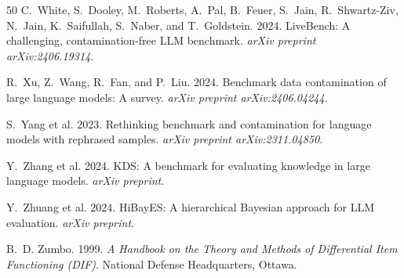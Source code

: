 \documentclass[11pt,a4paper]{article}
\begin{document}
\begin{thebibliography}{50}
C.~White, S.~Dooley, M.~Roberts, A.~Pal, B.~Feuer, S.~Jain, R.~Shwartz-Ziv, N.~Jain, K.~Saifullah, S.~Naber, and T.~Goldstein. 2024.
\newblock LiveBench: A challenging, contamination-free LLM benchmark.
\newblock \emph{arXiv preprint arXiv:2406.19314}.

R.~Xu, Z.~Wang, R.~Fan, and P.~Liu. 2024.
\newblock Benchmark data contamination of large language models: A survey.
\newblock \emph{arXiv preprint arXiv:2406.04244}.

S.~Yang et al. 2023.
\newblock Rethinking benchmark and contamination for language models with rephrased samples.
\newblock \emph{arXiv preprint arXiv:2311.04850}.

Y.~Zhang et al. 2024.
\newblock KDS: A benchmark for evaluating knowledge in large language models.
\newblock \emph{arXiv preprint}.

Y.~Zhuang et al. 2024.
\newblock HiBayES: A hierarchical Bayesian approach for LLM evaluation.
\newblock \emph{arXiv preprint}.

B.~D. Zumbo. 1999.
\newblock \emph{A Handbook on the Theory and Methods of Differential Item Functioning (DIF)}.
\newblock National Defense Headquarters, Ottawa.

\end{thebibliography}
\end{document}
